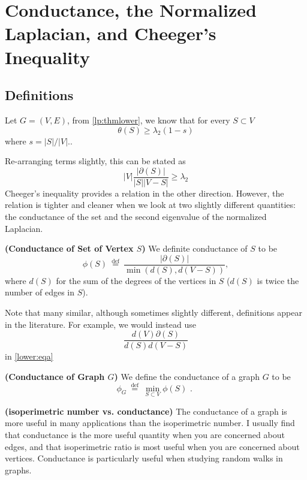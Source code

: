 \documentclass{article}
\newcommand{\bfs}[1]{\textbf{({#1}) }}
\begin{document}
\section{Conductance, the Normalized Laplacian, and Cheeger’s Inequality}\label{sec:cnc}
\subsection{Definitions}
Let $G=(V,E)$, from \cref{lp:thmlower}, we know that for every $S \subset V$
$$
\theta(S) \geq \lambda_{2}(1-s)
$$
where $s=|S| /|V| .$. 


Re-arranging terms slightly, this can be stated as
$$
|V| \frac{|\partial(S)|}{|S||V-S|} \geq \lambda_{2}
$$
Cheeger's inequality provides a relation in the other direction. However, the relation is tighter and cleaner when we look at two slightly different quantities: the conductance of the set and the second eigenvalue of the normalized Laplacian.

\begin{defa}{\bfs{Conductance of Set of Vertex $S$}}
We definite conductance of $S$ to be
$$
\phi(S) \stackrel{\text { def }}{=} \frac{|\partial(S)|}{\min (d(S), d(V-S))},
$$
where $d(S)$ for the sum of the degrees of the vertices in $S$ ($d(S)$ is twice the number of edges in $S$).
\end{defa}
\begin{rema}
Note that many similar, although sometimes slightly different, definitions appear in the literature. For example, we would instead use
$$
\frac{d(V) \partial(S)}{d(S) d(V-S)}
$$ in \cref{lower:eqa}
\end{rema}
\begin{defa}{\bfs{Conductance of Graph $G$}}
We define the conductance of a graph $G$ to be
$$
\phi_{G} \stackrel{\text { def }}{=} \min _{S \subset V} \phi(S) \text { . }
$$
\end{defa}
\begin{rema}{\bfs{isoperimetric number vs. conductance}}
The conductance of a graph is more useful in many applications than the isoperimetric number. I usually find that conductance is the more useful quantity when you are concerned about edges, and that isoperimetric ratio is most useful when you are concerned about vertices. Conductance is particularly useful when studying random walks in graphs.
\end{rema}
\end{document}
